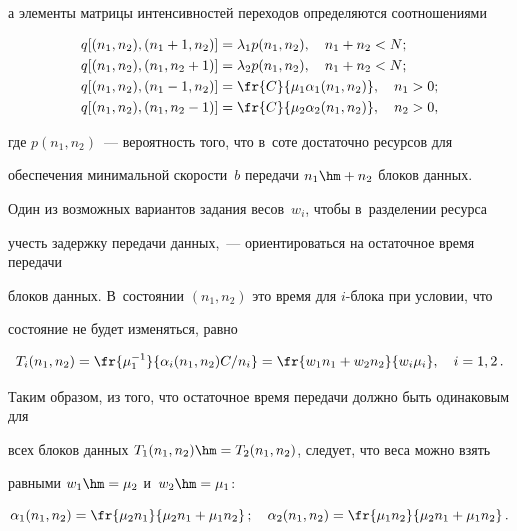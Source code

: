 а элементы матрицы интенсивностей переходов определяются соотношениями


\begin{align*}


& q[(n_1,n_2),(n_1+1,n_2)] = \lambda_1  p(n_1,n_2), \quad n_1+n_2<N; \\


& q[(n_1,n_2),(n_1,n_2+1)] = \lambda_2  p(n_1,n_2), \quad n_1+n_2<N; \\


& q[(n_1,n_2),(n_1-1,n_2)] = \fr{C}{\mu_1 \alpha_1(n_1,n_2)}, \quad n_1>0; \\


& q[(n_1,n_2),(n_1,n_2-1)] = \fr{C}{\mu_2 \alpha_2(n_1,n_2)}, \quad n_2>0,


\end{align*}


где $p(n_1,n_2)$~--- вероятность того, что в~соте достаточно ресурсов для 


обеспечения минимальной ско\-рости~$b$ передачи $n_1\hm+n_2$ блоков данных.





Один из возможных вариантов задания весов~$w_i$, чтобы в~разделении ресурса 


учесть задержку передачи данных,~--- ориентироваться на остаточное время передачи 


блоков данных. В~состоянии $(n_1,n_2)$ это время для $i$-бло\-ка при условии, что 


состояние не будет изменяться, равно


\begin{equation*}


T_i(n_1,n_2) = \fr{\mu_1^{-1}}{\alpha_i(n_1,n_2) C / n_i} = 


\fr{w_1n_1+w_2n_2}{w_i\mu_i}, \quad i=1,2\,.


\end{equation*}





Таким образом, из того, что остаточное время передачи должно быть одинаковым для 


всех блоков данных $T_1(n_1,n_2) \hm= T_2(n_1,n_2)$, следует, что веса можно взять 


равными $w_1\hm=\mu_2$ и~$w_2\hm=\mu_1$:


\begin{equation*}


\alpha_1(n_1,n_2) = \fr{\mu_2 n_1}{\mu_2 n_1+\mu_1 n_2}\,; \quad


\alpha_2(n_1,n_2) = \fr{\mu_1 n_2}{\mu_2 n_1+\mu_1 n_2}\,.


\end{equation*}





